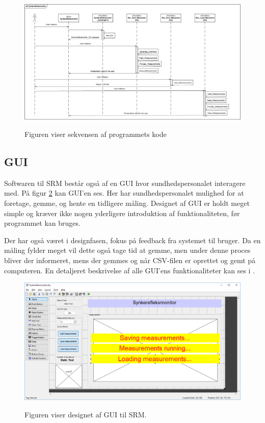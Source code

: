 \begin{figure}[H]
\centering
{\includegraphics[width=\linewidth]
{Figure/SekevensDiagram}}
\caption{Figuren viser sekvensen af programmets kode}
\label{Fig:SekevensDiagram}
\end{figure} 


\subsection{GUI}

Softwaren til SRM består også af en GUI hvor sundhedspersonalet interagere med. På figur \ref{Fig:designGUI} kan GUI'en ses. Her har sundhedspersonalet mulighed for at foretage, gemme, og hente en tidligere måling. Designet af GUI er holdt meget simple og kræver ikke nogen yderligere introduktion af funktionaliteten, før programmet kan bruges. 

Der har også været i designfasen, fokus på feedback fra systemet til bruger. Da en måling fylder meget vil dette også tage tid at gemme, men under denne proces bliver der informeret, mens der gemmes og når CSV-filen er oprettet og gemt på computeren. En detaljeret beskrivelse af alle GUI'ens funktionaliteter kan ses i .


\begin{figure}[H]
\centering
{\includegraphics[width=14cm]
{Figure/designGUI}}
\caption{Figuren viser designet af GUI til SRM.}
\label{Fig:designGUI}
\end{figure} 